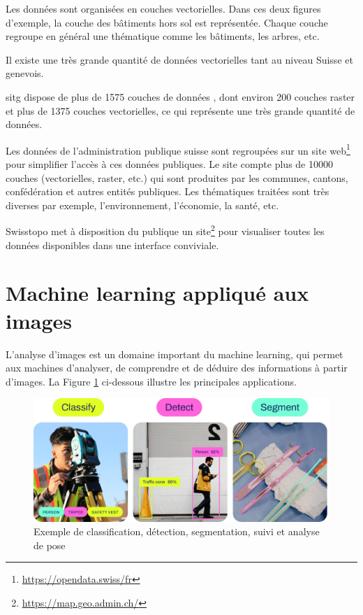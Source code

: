 Les données sont organisées en couches vectorielles. Dans ces deux figures d'exemple, la couche des bâtiments hors sol est représentée. Chaque couche regroupe en général une thématique comme les bâtiments, les arbres, etc.

Il existe une très grande quantité de données vectorielles tant au niveau Suisse et genevois.

\acrshort{sitg} dispose de plus de 1575 couches de données \cite{sitg_chiffre-cle_2025}, dont environ 200 couches raster et plus de 1375 couches vectorielles, ce qui représente une très grande quantité de données.

Les données de l'administration publique suisse sont regroupées sur un site web\footnote{\url{https://opendata.swiss/fr}} pour simplifier l'accès à ces données publiques. Le site compte plus de 10000 couches (vectorielles, raster, etc.) qui sont produites par les communes, cantons, confédération et autres entités publiques. Les thématiques traitées sont très diverses par exemple, l'environnement, l'économie, la santé, etc.

Swisstopo met à disposition du publique un site\footnote{\url{https://map.geo.admin.ch/}} pour visualiser toutes les données disponibles dans une interface conviviale.

\newpage
\section{Machine learning appliqué aux images}

L'analyse d'images est un domaine important du machine learning, qui permet aux machines d'analyser, de comprendre et de déduire des informations à partir d'images. La Figure \ref{fig:A1_22_schema_ml} ci-dessous illustre les principales applications.

\begin{figure}[H]
    \centering
    \includegraphics[width=1\linewidth]{03-tail//A1_fondamentaux_ML//A1_figures/A1_22_schema_ml.png}
    \caption{Exemple de classification, détection, segmentation, suivi et analyse de pose \cite{ultralytics_classer_nodate}}
    \label{fig:A1_22_schema_ml}
\end{figure}

